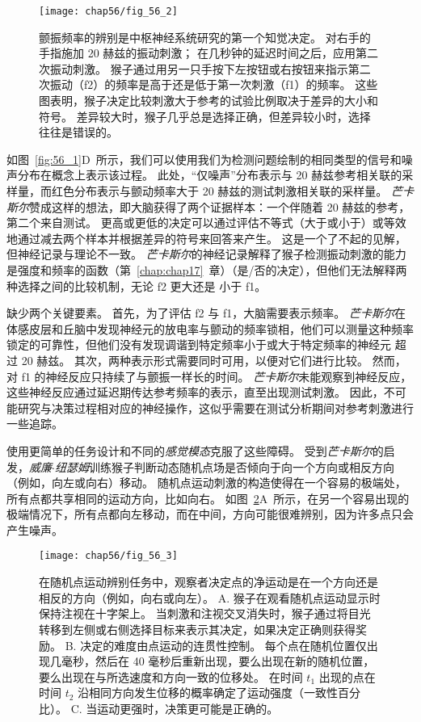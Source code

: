 \begin{figure}[htbp]
	\centering
	\texttt{[image: chap56/fig\_56\_2]}
	\caption{颤振频率的辨别是中枢神经系统研究的第一个知觉决定。
		对右手的手指施加 20 赫兹的振动刺激；
		在几秒钟的延迟时间之后，应用第二次振动刺激。
		猴子通过用另一只手按下左按钮或右按钮来指示第二次振动（f2）的频率是高于还是低于第一次刺激（f1）的频率。
		这些图表明，猴子决定比较刺激大于参考的试验比例取决于差异的大小和符号。
		差异较大时，猴子几乎总是选择正确，但差异较小时，选择往往是错误的\cite{romo2001touch}。}
	\label{fig:56_2}
\end{figure}


如图~\ref{fig:56_1}D~所示，我们可以使用我们为检测问题绘制的相同类型的信号和噪声分布在概念上表示该过程。
此处，“仅噪声”分布表示与 20 赫兹参考相关联的采样量，而红色分布表示与颤动频率大于 20 赫兹的测试刺激相关联的采样量。
\textit{芒卡斯尔}赞成这样的想法，即大脑获得了两个证据样本：一个伴随着 20 赫兹的参考，第二个来自测试。
更高或更低的决定可以通过评估不等式（大于或小于）或等效地通过减去两个样本并根据差异的符号来回答来产生。
这是一个了不起的见解，但神经记录与理论不一致。
\textit{芒卡斯尔}的神经记录解释了猴子检测振动刺激的能力是强度和频率的函数（第~\ref{chap:chap17}~章）（是/否的决定），但他们无法解释两种选择之间的比较机制，无论 f2 更大还是 小于 f1。


缺少两个关键要素。
首先，为了评估 f2 与 f1，大脑需要表示频率。
\textit{芒卡斯尔}在体感皮层和丘脑中发现神经元的放电率与颤动的频率锁相，他们可以测量这种频率锁定的可靠性，但他们没有发现调谐到特定频率小于或大于特定频率的神经元 超过 20 赫兹。
其次，两种表示形式需要同时可用，以便对它们进行比较。
然而，对 f1 的神经反应只持续了与颤振一样长的时间。
\textit{芒卡斯尔}未能观察到神经反应，这些神经反应通过延迟期传达参考频率的表示，直至出现测试刺激。
因此，不可能研究与决策过程相对应的神经操作，这似乎需要在测试分析期间对参考刺激进行一些追踪。


使用更简单的任务设计和不同的\textit{感觉模态}克服了这些障碍。
受到\textit{芒卡斯尔}的启发，\textit{威廉$\cdot$纽瑟姆}训练猴子判断动态随机点场是否倾向于向一个方向或相反方向（例如，向左或向右）移动。
随机点运动刺激的构造使得在一个容易的极端处，所有点都共享相同的运动方向，比如向右。
如图~\ref{fig:56_3}A~所示，在另一个容易出现的极端情况下，所有点都向左移动，而在中间，方向可能很难辨别，因为许多点只会产生噪声。


\begin{figure}[htbp]
	\centering
	\texttt{[image: chap56/fig\_56\_3]}
	\caption{在随机点运动辨别任务中，观察者决定点的净运动是在一个方向还是相反的方向（例如，向右或向左）。
		A. 猴子在观看随机点运动显示时保持注视在十字架上。
		当刺激和注视交叉消失时，猴子通过将目光转移到左侧或右侧选择目标来表示其决定，如果决定正确则获得奖励。
		B. 决定的难度由点运动的连贯性控制。
		每个点在随机位置仅出现几毫秒，然后在 40 毫秒后重新出现，要么出现在新的随机位置，要么出现在与所选速度和方向一致的位移处。
		在时间 $t_1$ 出现的点在时间 $t_2$ 沿相同方向发生位移的概率确定了运动强度（一致性百分比）\cite{britten1992analysis}。
		C. 当运动更强时，决策更可能是正确的。}
	\label{fig:56_3}
\end{figure}


